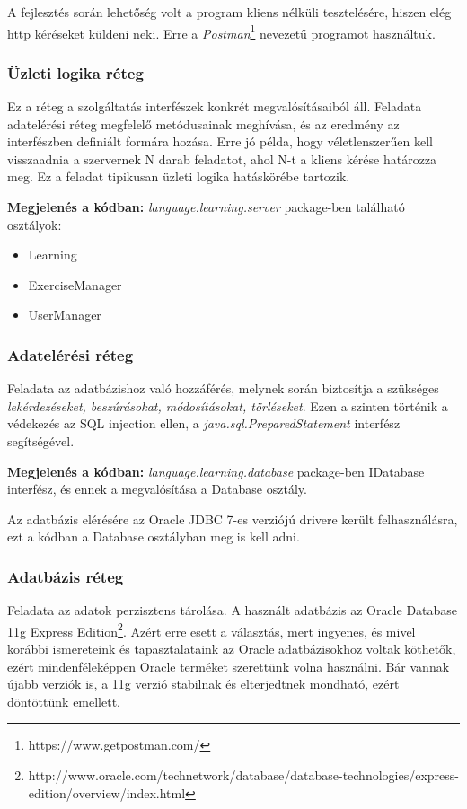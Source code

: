 \documentclass[11pt, a4paper]{article}
\begin{document}
    A fejlesztés során lehetőség volt a program kliens nélküli tesztelésére, hiszen elég http kéréseket küldeni neki. Erre a \textit{Postman}\footnote{https://www.getpostman.com/} nevezetű programot használtuk.
    
    \subsubsection{Üzleti logika réteg}
    Ez a réteg a szolgáltatás interfészek konkrét megvalósításaiból áll. Feladata adatelérési réteg megfelelő metódusainak meghívása, és az eredmény az interfészben definiált formára hozása. Erre jó példa, hogy véletlenszerűen kell visszaadnia a szervernek N darab feladatot, ahol N-t a kliens kérése határozza meg. Ez a feladat tipikusan üzleti logika hatáskörébe tartozik.
    
    \textbf{Megjelenés a kódban:} \textit{language.learning.server} package-ben található osztályok: 
    \begin{itemize}
    	\item Learning
    	\item ExerciseManager
    	\item UserManager
    \end{itemize}
    
    \subsubsection{Adatelérési réteg}
    Feladata az adatbázishoz való hozzáférés, melynek során biztosítja a szükséges \textit{lekérdezéseket, beszúrásokat, módosításokat, törléseket}. Ezen a szinten történik a védekezés az SQL injection ellen, a \textit{java.sql.PreparedStatement} interfész segítségével.
    
    \textbf{Megjelenés a kódban:} \textit{language.learning.database} package-ben IDatabase interfész, és ennek a megvalósítása a Database osztály.
    
    Az adatbázis elérésére az Oracle JDBC 7-es verziójú drivere került felhasználásra, ezt a kódban a Database osztályban meg is kell adni.
    
    \subsubsection{Adatbázis réteg}
    Feladata az adatok perzisztens tárolása. A használt adatbázis az Oracle Database 11g Express Edition\footnote{http://www.oracle.com/technetwork/database/database-technologies/express-edition/overview/index.html}. Azért erre esett a választás, mert ingyenes, és mivel korábbi ismereteink és tapasztalataink az Oracle adatbázisokhoz voltak köthetők, ezért mindenféleképpen Oracle terméket szerettünk volna használni. Bár vannak újabb verziók is, a 11g verzió stabilnak és elterjedtnek mondható, ezért döntöttünk emellett.
    
\end{document}
